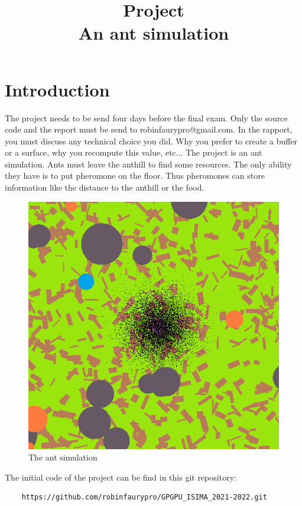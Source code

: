 \documentclass{article}
\begin{document}
\title{Project\\An ant simulation}
\maketitle

\section{Introduction}
The project needs to be send four days before the final exam. Only the source code and the report must be send to robinfaurypro@gmail.com. In the rapport, you must discuss any technical choice you did. Why you prefer to create a buffer or a surface, why you recompute this value, etc...
The project is an ant simulation. Ants must leave the anthill to find some resources. The only ability they have is to put pheromone on the floor. Thus pheromones can store information like the distance to the anthill or the food.
\begin{figure}[H]
	\centering
	\includegraphics[scale=0.8]{figures/ant.png}
	\caption{The ant simulation}
\end{figure}

The initial code of the project can be find in this git repository:
\begin{lstlisting}
	https://github.com/robinfaurypro/GPGPU_ISIMA_2021-2022.git
\end{lstlisting}
\end{document}
